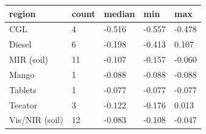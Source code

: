 \begin{tabular}{lllll}
\hline
region & count & median & min & max \\
\hline
CGL & 4 & -0.516 & -0.557 & -0.478 \\
Diesel & 6 & -0.198 & -0.413 & 0.107 \\
MIR (soil) & 11 & -0.107 & -0.157 & -0.060 \\
Mango & 1 & -0.088 & -0.088 & -0.088 \\
Tablets & 1 & -0.077 & -0.077 & -0.077 \\
Tecator & 3 & -0.122 & -0.176 & 0.013 \\
Vis/NIR (soil) & 12 & -0.083 & -0.108 & -0.047 \\
\hline
\end{tabular}
